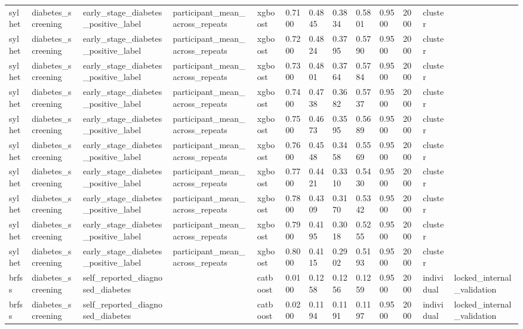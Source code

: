 \begin{tabular}{lllllllllllll}
sylhet & diabetes\_screening & early\_stage\_diabetes\_positive\_label & participant\_mean\_across\_repeats & xgboost & 0.7100 & 0.4845 & 0.3834 & 0.5801 & 0.9500 & 2000 & cluster &  \\
sylhet & diabetes\_screening & early\_stage\_diabetes\_positive\_label & participant\_mean\_across\_repeats & xgboost & 0.7200 & 0.4824 & 0.3795 & 0.5790 & 0.9500 & 2000 & cluster &  \\
sylhet & diabetes\_screening & early\_stage\_diabetes\_positive\_label & participant\_mean\_across\_repeats & xgboost & 0.7300 & 0.4801 & 0.3764 & 0.5784 & 0.9500 & 2000 & cluster &  \\
sylhet & diabetes\_screening & early\_stage\_diabetes\_positive\_label & participant\_mean\_across\_repeats & xgboost & 0.7400 & 0.4738 & 0.3682 & 0.5737 & 0.9500 & 2000 & cluster &  \\
sylhet & diabetes\_screening & early\_stage\_diabetes\_positive\_label & participant\_mean\_across\_repeats & xgboost & 0.7500 & 0.4673 & 0.3595 & 0.5689 & 0.9500 & 2000 & cluster &  \\
sylhet & diabetes\_screening & early\_stage\_diabetes\_positive\_label & participant\_mean\_across\_repeats & xgboost & 0.7600 & 0.4548 & 0.3458 & 0.5569 & 0.9500 & 2000 & cluster &  \\
sylhet & diabetes\_screening & early\_stage\_diabetes\_positive\_label & participant\_mean\_across\_repeats & xgboost & 0.7700 & 0.4421 & 0.3310 & 0.5430 & 0.9500 & 2000 & cluster &  \\
sylhet & diabetes\_screening & early\_stage\_diabetes\_positive\_label & participant\_mean\_across\_repeats & xgboost & 0.7800 & 0.4309 & 0.3170 & 0.5342 & 0.9500 & 2000 & cluster &  \\
sylhet & diabetes\_screening & early\_stage\_diabetes\_positive\_label & participant\_mean\_across\_repeats & xgboost & 0.7900 & 0.4195 & 0.3018 & 0.5255 & 0.9500 & 2000 & cluster &  \\
sylhet & diabetes\_screening & early\_stage\_diabetes\_positive\_label & participant\_mean\_across\_repeats & xgboost & 0.8000 & 0.4115 & 0.2902 & 0.5193 & 0.9500 & 2000 & cluster &  \\
brfss & diabetes\_screening & self\_reported\_diagnosed\_diabetes &  & catboost & 0.0100 & 0.1258 & 0.1256 & 0.1259 & 0.9500 & 2000 & individual & locked\_internal\_validation \\
brfss & diabetes\_screening & self\_reported\_diagnosed\_diabetes &  & catboost & 0.0200 & 0.1194 & 0.1191 & 0.1197 & 0.9500 & 2000 & individual & locked\_internal\_validation \\

\end{tabular}
